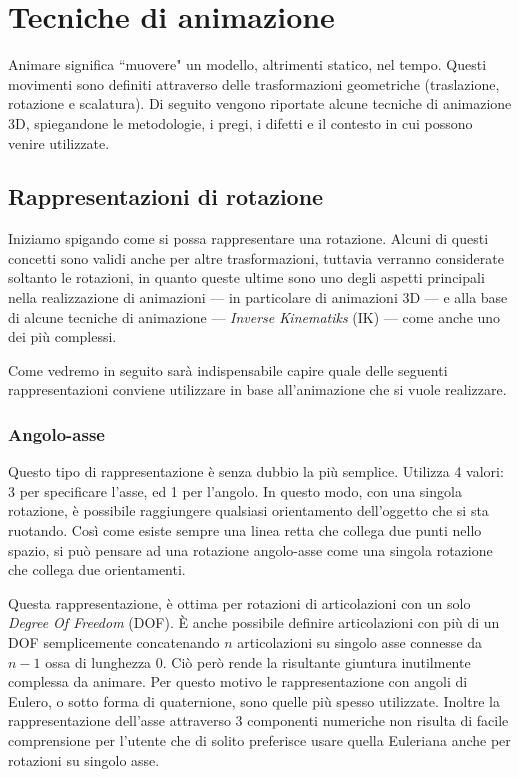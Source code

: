 
\chapter{Tecniche di animazione} %

\label{Chapter3} %

Animare significa ``muovere" un modello, altrimenti statico, nel tempo. Questi movimenti sono definiti attraverso delle trasformazioni geometriche (traslazione, rotazione e scalatura).
Di seguito vengono riportate alcune tecniche di animazione 3D, spiegandone le metodologie, i pregi, i difetti e il contesto in cui possono venire utilizzate.


\section{Rappresentazioni di rotazione}\label{Section3.1}
Iniziamo spigando come si possa rappresentare una rotazione. Alcuni di questi concetti sono validi anche per altre trasformazioni, tuttavia verranno considerate soltanto le rotazioni, in quanto queste ultime sono uno degli aspetti principali nella realizzazione di animazioni --- in particolare di animazioni 3D --- e alla base di alcune tecniche di animazione --- \emph{Inverse Kinematiks} (IK) --- come anche uno dei più complessi. 

Come vedremo in seguito sarà indispensabile capire quale delle seguenti rappresentazioni conviene utilizzare in base all'animazione che si vuole realizzare.


\subsection{Angolo-asse}
Questo tipo di rappresentazione è senza dubbio la più semplice.
Utilizza 4 valori: 3 per specificare l'asse, ed 1 per l'angolo. In questo modo, con una singola rotazione, è possibile raggiungere qualsiasi orientamento dell'oggetto che si sta ruotando. Così come esiste sempre una linea retta che collega due punti nello spazio, si può pensare ad una rotazione angolo-asse come una singola rotazione che collega due orientamenti.

Questa rappresentazione, è ottima per rotazioni di articolazioni con un solo \emph{Degree Of Freedom} (DOF). È anche possibile definire articolazioni con più di un DOF semplicemente concatenando $n$ articolazioni su singolo asse connesse da $n-1$ ossa di lunghezza 0. Ciò però rende la risultante giuntura inutilmente complessa da animare. Per questo motivo le rappresentazione con angoli di Eulero, o sotto forma di quaternione, sono quelle più spesso utilizzate. Inoltre la rappresentazione dell'asse attraverso 3 componenti numeriche non risulta di facile comprensione per l'utente che di solito preferisce usare quella Euleriana anche per rotazioni su singolo asse.

